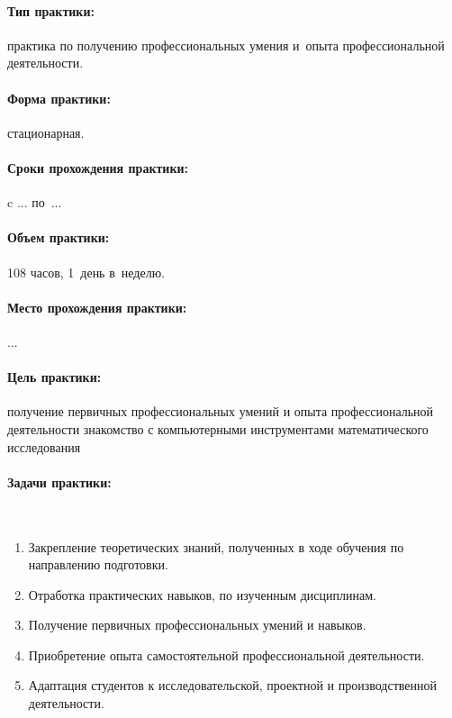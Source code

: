 \documentclass[14pt,Otchet]{diplomwork}
\date{2020}
\author{МКб-4301-51-00}{Фамилых Имярек Батькович}
\institute{математики и информационных систем}
\begin{document}
\maketitle
\newpage

\tableofcontents

\paragraph{Тип практики:} практика по получению профессиональных умения и~опыта профессиональной деятельности.
		
\paragraph{Форма практики:}	стационарная.
\paragraph{Сроки прохождения практики:}
	c ... по~... 
\paragraph{Объем практики:} 108 часов, 1~день в~неделю.
\paragraph{Место прохождения практики:} ...

	
	
\paragraph{Цель практики:}
	получение первичных профессиональных умений и опыта профессиональной деятельности знакомство с компьютерными инструментами математического исследования

\paragraph{Задачи практики:}~\par
	\begin{enumerate}
	\item 
		Закрепление теоретических знаний, полученных в ходе обучения по направлению подготовки.
	\item 
		Отработка практических навыков, по изученным дисциплинам.
	\item 
		Получение первичных профессиональных умений и навыков.
	\item 
		Приобретение опыта самостоятельной профессиональной деятельности.
	\item 
		Адаптация студентов к исследовательской, проектной и производственной деятельности.

	\end{enumerate}
\end{document}
